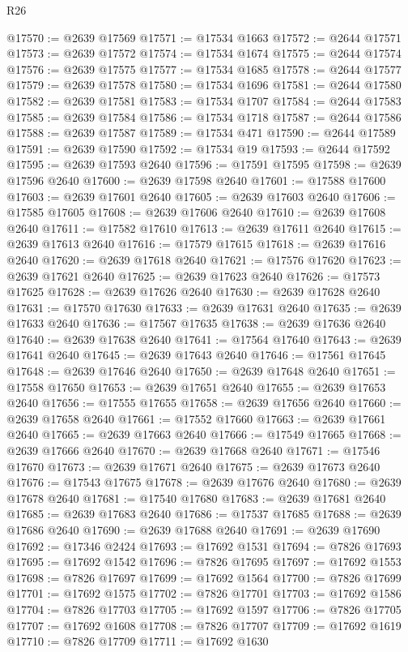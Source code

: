 \begin{lexlean}{R26}
\begin{coremodule}
@17570 := @2639 @17569
@17571 := @17534 @1663
@17572 := @2644 @17571
@17573 := @2639 @17572
@17574 := @17534 @1674
@17575 := @2644 @17574
@17576 := @2639 @17575
@17577 := @17534 @1685
@17578 := @2644 @17577
@17579 := @2639 @17578
@17580 := @17534 @1696
@17581 := @2644 @17580
@17582 := @2639 @17581
@17583 := @17534 @1707
@17584 := @2644 @17583
@17585 := @2639 @17584
@17586 := @17534 @1718
@17587 := @2644 @17586
@17588 := @2639 @17587
@17589 := @17534 @471
@17590 := @2644 @17589
@17591 := @2639 @17590
@17592 := @17534 @19
@17593 := @2644 @17592
@17595 := @2639 @17593 @2640
@17596 := @17591 @17595
@17598 := @2639 @17596 @2640
@17600 := @2639 @17598 @2640
@17601 := @17588 @17600
@17603 := @2639 @17601 @2640
@17605 := @2639 @17603 @2640
@17606 := @17585 @17605
@17608 := @2639 @17606 @2640
@17610 := @2639 @17608 @2640
@17611 := @17582 @17610
@17613 := @2639 @17611 @2640
@17615 := @2639 @17613 @2640
@17616 := @17579 @17615
@17618 := @2639 @17616 @2640
@17620 := @2639 @17618 @2640
@17621 := @17576 @17620
@17623 := @2639 @17621 @2640
@17625 := @2639 @17623 @2640
@17626 := @17573 @17625
@17628 := @2639 @17626 @2640
@17630 := @2639 @17628 @2640
@17631 := @17570 @17630
@17633 := @2639 @17631 @2640
@17635 := @2639 @17633 @2640
@17636 := @17567 @17635
@17638 := @2639 @17636 @2640
@17640 := @2639 @17638 @2640
@17641 := @17564 @17640
@17643 := @2639 @17641 @2640
@17645 := @2639 @17643 @2640
@17646 := @17561 @17645
@17648 := @2639 @17646 @2640
@17650 := @2639 @17648 @2640
@17651 := @17558 @17650
@17653 := @2639 @17651 @2640
@17655 := @2639 @17653 @2640
@17656 := @17555 @17655
@17658 := @2639 @17656 @2640
@17660 := @2639 @17658 @2640
@17661 := @17552 @17660
@17663 := @2639 @17661 @2640
@17665 := @2639 @17663 @2640
@17666 := @17549 @17665
@17668 := @2639 @17666 @2640
@17670 := @2639 @17668 @2640
@17671 := @17546 @17670
@17673 := @2639 @17671 @2640
@17675 := @2639 @17673 @2640
@17676 := @17543 @17675
@17678 := @2639 @17676 @2640
@17680 := @2639 @17678 @2640
@17681 := @17540 @17680
@17683 := @2639 @17681 @2640
@17685 := @2639 @17683 @2640
@17686 := @17537 @17685
@17688 := @2639 @17686 @2640
@17690 := @2639 @17688 @2640
@17691 := @2639 @17690
@17692 := @17346 @2424
@17693 := @17692 @1531
@17694 := @7826 @17693
@17695 := @17692 @1542
@17696 := @7826 @17695
@17697 := @17692 @1553
@17698 := @7826 @17697
@17699 := @17692 @1564
@17700 := @7826 @17699
@17701 := @17692 @1575
@17702 := @7826 @17701
@17703 := @17692 @1586
@17704 := @7826 @17703
@17705 := @17692 @1597
@17706 := @7826 @17705
@17707 := @17692 @1608
@17708 := @7826 @17707
@17709 := @17692 @1619
@17710 := @7826 @17709
@17711 := @17692 @1630

\end{coremodule}
\end{lexlean}
